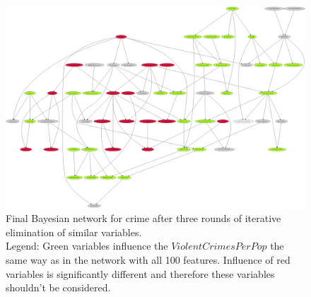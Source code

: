\begin{hugepage}
\pdfpagewidth
\begin{figure}[h]
    \centering
    \vspace*{-2.5cm}
    \includegraphics[scale=0.83]{fig/round-3_intersection_tolerance-1}
    \caption{Final Bayesian network for crime after three rounds of iterative elimination of similar variables.
    \\Legend: Green variables influence the $ViolentCrimesPerPop$ the same way as in the network with all 100 features. Influence of red variables is significantly different and therefore these variables shouldn't be considered.}
    \label{fig:crime_net_round3}
\end{figure}
\end{hugepage}

